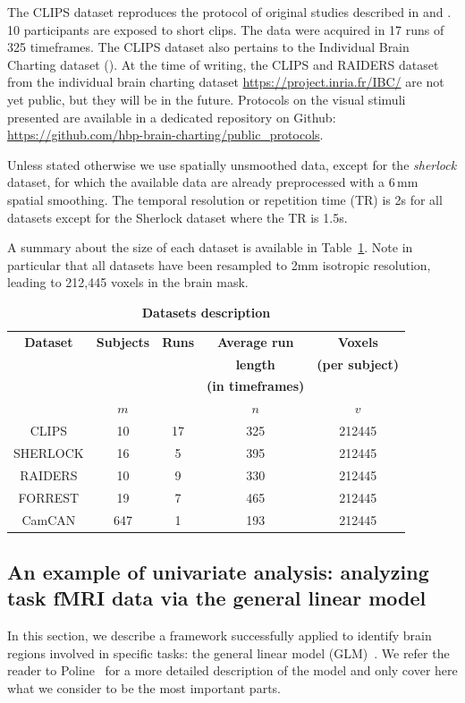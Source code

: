 The CLIPS dataset reproduces the protocol of original studies described in
\cite{nishimoto2011reconstructing} and \cite{huth2012continuous}. 10
participants are exposed to short clips. The data were acquired in 17 runs of 325 timeframes. 
%
The CLIPS dataset also pertains to the Individual Brain Charting dataset
(\cite{ibc, ibc2}).
%
At the time of writing, the CLIPS and RAIDERS dataset from the individual brain charting dataset \url{https://project.inria.fr/IBC/} are not yet public, but they will be in the future. Protocols on the visual stimuli presented are available in a dedicated repository on Github: \url{https://github.com/hbp-brain-charting/public_protocols}.

Unless stated otherwise we use spatially unsmoothed data, except for the
\emph{sherlock} dataset, for which the available data are already preprocessed
with a 6\,mm spatial smoothing. The temporal resolution or repetition time (TR) is 2s for all datasets except for the Sherlock dataset where the TR is 1.5s.
%

A summary about the size of each dataset is available in Table~\ref{tab:dataset_desc2}. Note in particular that all datasets have been resampled to 2mm isotropic resolution, leading to 212,445 voxels in the brain mask.
\begin{table}
	\begin{tabular}{|c|c|c|c|c|}
		\hline
		\textbf{Dataset} & \textbf{Subjects} & \textbf{Runs} & \textbf{Average run} & \textbf{Voxels} \\
                     && & \textbf{length} & \textbf{(per subject)} \\
                     && & \textbf{(in timeframes)} &  \\
                     &$m$& $ $ & $n$ &$v$  \\
		\hline
		CLIPS & 10 & 17 & 325 & 212445\\ 
		\hline
		SHERLOCK & 16 & 5 & 395 & 212445 \\ 
		\hline
		RAIDERS & 10 & 9 & 330 & 212445 \\
		\hline 
		FORREST & 19 & 7 & 465 & 212445\\
		\hline
		CamCAN & 647 & 1 & 193 & 212445 \\
		\hline
	\end{tabular}
  \caption{\textbf{Datasets description}}
  \label{tab:dataset_desc2}
\end{table}

\subsection{An example of univariate analysis: analyzing task fMRI data via the general linear model}
\label{sec:glm}
In this section, we describe a framework successfully applied to identify brain regions involved in specific tasks: the general linear model
(GLM)~\cite{friston1995analysis}. We refer the reader to
Poline~\cite{poline2012general} for a more detailed description of the model and only cover here what we consider to be the most important parts.

